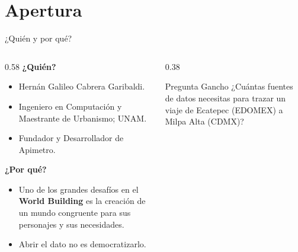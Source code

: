 \section{Apertura}

\begin{frame}{¿Quién y por qué?}
  \begin{columns}[T]
    \begin{column}{0.58\textwidth}
      {\color{SotmVerde}\bfseries ¿Quién?}
      \begin{itemize}
        \item Hernán Galileo Cabrera Garibaldi.
        \item Ingeniero en Computación y Maestrante de Urbanismo; UNAM.
        \item Fundador y Desarrollador de Apimetro.   %
      \end{itemize}

      \vspace{0.2cm}
      {\color{SotmVerde}\bfseries ¿Por qué?}
      \begin{itemize}
        \item Uno de los grandes desafíos en el \textbf{World Building} es la creación de un mundo congruente para sus personajes y sus necesidades.
        \item Abrir el dato no es democratizarlo.
      \end{itemize}
    \end{column}
    \begin{column}{0.38\textwidth}
      \begin{block}{Pregunta Gancho}
        ¿Cuántas fuentes de datos necesitas para trazar un viaje de Ecatepec (EDOMEX) a Milpa Alta (CDMX)?
      \end{block}
    \end{column}
  \end{columns}
\end{frame}

